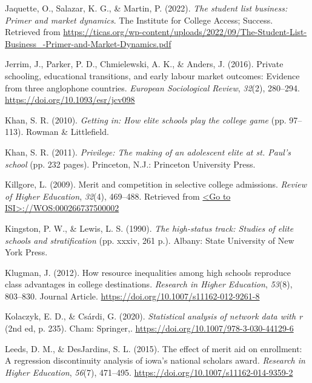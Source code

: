 \documentclass[
  12pt,
]{article}
\newlength{\cslhangindent}
\newenvironment{CSLReferences}[2] %
 {\begin{list}{}{%
  \setlength{\itemindent}{0pt}
  \setlength{\leftmargin}{0pt}
  \setlength{\parsep}{0pt}
  \ifodd #1
   \setlength{\leftmargin}{\cslhangindent}
   \setlength{\itemindent}{-1\cslhangindent}
  \fi
  \setlength{\itemsep}{#2\baselineskip}}}
 {\end{list}}
\begin{document}
\begin{CSLReferences}{1}{0}
Jaquette, O., Salazar, K. G., \& Martin, P. (2022). \emph{The student list business: Primer and market dynamics}. The Institute for College Access; Success. Retrieved from \url{https://ticas.org/wp-content/uploads/2022/09/The-Student-List-Business_-Primer-and-Market-Dynamics.pdf}

Jerrim, J., Parker, P. D., Chmielewski, A. K., \& Anders, J. (2016). Private schooling, educational transitions, and early labour market outcomes: Evidence from three anglophone countries. \emph{European Sociological Review}, \emph{32}(2), 280--294. \url{https://doi.org/10.1093/esr/jcv098}

Khan, S. R. (2010). \emph{Getting in: How elite schools play the college game} (pp. 97--113). Rowman \& Littlefield.

Khan, S. R. (2011). \emph{Privilege: The making of an adolescent elite at st. Paul's school} (pp. 232 pages). Princeton, N.J.: Princeton University Press.

Killgore, L. (2009). Merit and competition in selective college admissions. \emph{Review of Higher Education}, \emph{32}(4), 469--488. Retrieved from \href{\%3CGo\%20to\%20ISI\%3E://WOS:000266737500002}{\textless Go to ISI\textgreater://WOS:000266737500002}

Kingston, P. W., \& Lewis, L. S. (1990). \emph{The high-status track: Studies of elite schools and stratification} (pp. xxxiv, 261 p.). Albany: State University of New York Press.

Klugman, J. (2012). How resource inequalities among high schools reproduce class advantages in college destinations. \emph{Research in Higher Education}, \emph{53}(8), 803--830. Journal Article. \url{https://doi.org/10.1007/s11162-012-9261-8}

Kolaczyk, E. D., \& Csárdi, G. (2020). \emph{Statistical analysis of network data with r} (2nd ed, p. 235). Cham: Springer,. \url{https://doi.org/10.1007/978-3-030-44129-6}

Leeds, D. M., \& DesJardins, S. L. (2015). The effect of merit aid on enrollment: A regression discontinuity analysis of iowa's national scholars award. \emph{Research in Higher Education}, \emph{56}(7), 471--495. \url{https://doi.org/10.1007/s11162-014-9359-2}


\end{CSLReferences}
\end{document}
